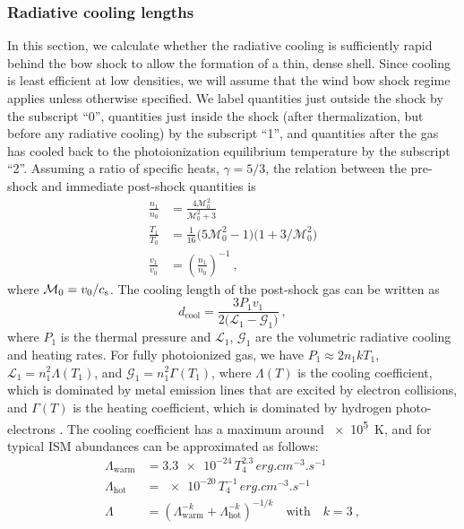 \subsubsection{Radiative cooling lengths}
\label{sec:radi-cool-lengths}
\newcommand\M{\ensuremath{\mathcal{M}}}
In this section, we calculate whether the radiative cooling is
sufficiently rapid behind the bow shock to allow the formation of a
thin, dense shell.  Since cooling is least efficient at low densities,
we will assume that the wind bow shock regime applies unless otherwise
specified. We label quantities just outside the shock by the subscript
``0'', quantities just inside the shock (after thermalization, but
before any radiative cooling) by the subscript ``1'', and quantities
after the gas has cooled back to the photoionization equilibrium
temperature by the subscript ``2''.  Assuming a ratio of specific
heats, \(\gamma = 5/3\), the relation between the pre-shock and immediate
post-shock quantities is
\begin{align}
  \label{eq:shock-n-jump}
  \frac{n_1}{n_0} &= \frac{4 \M_0^2} {\M_0^2 + 3} \\
  \label{eq:shock-T-jump}
  \frac{T_1}{T_0} &= \tfrac1{16} \bigl( 5\M_0^2 - 1 \bigr) \bigl( 1 + 3/\M_0^2 \bigr) \\
  \label{eq:shock-v-jump}
  \frac{v_1}{v_0} &= \left(\frac{n_1}{n_0}\right)^{-1} \ ,
\end{align}
where \(\M_0 = v_0 / \sound\).  The cooling length of the post-shock
gas can be written as
\newcommand\cool{\ensuremath{_{\text{cool}}}}
\begin{equation}
  \label{eq:dcool}
  d\cool = \frac{3 P_1 v_1} { 2 \bigl(  \mathcal{L}_1 - \mathcal{G}_1 \bigr) }\ ,  
\end{equation}
where \(P_1\) is the thermal pressure and \(\mathcal{L}_1\),
\(\mathcal{G}_1\) are the volumetric radiative cooling and heating
rates.  For fully photoionized gas, we have
\(P_1 \approx 2 n_1 k T_1\), \(\mathcal{L}_1 = n_1^2 \Lambda(T_1)\), and
\(\mathcal{G}_1 = n_1^2 \Gamma(T_1)\), where \(\Lambda(T)\) is the cooling
coefficient, which is dominated by metal emission lines that are
excited by electron collisions, and \(\Gamma(T)\) is the heating
coefficient, which is dominated by hydrogen photo-electrons
\citep{Osterbrock:2006a}. The cooling coefficient has a maximum around
\SI{e5}{K}, and for typical ISM abundances can be approximated as
follows:
\begin{align}
  \label{eq:cooling-coefficient}
  \Lambda_{\text{warm}} &= \num{3.3e-24} \, T_4^{2.3} \, \si{erg.cm^{-3}.s^{-1}}\\
  \Lambda_{\text{hot}} &= \num{e-20} \, T_4^{-1}\, \si{erg.cm^{-3}.s^{-1}} \\
  \Lambda &= \left( \Lambda_{\text{warm}}^{-k} +  \Lambda_{\text{hot}}^{-k} \right)^{-1/k}
      \quad \text{with} \quad k = 3 \ ,
\end{align}
